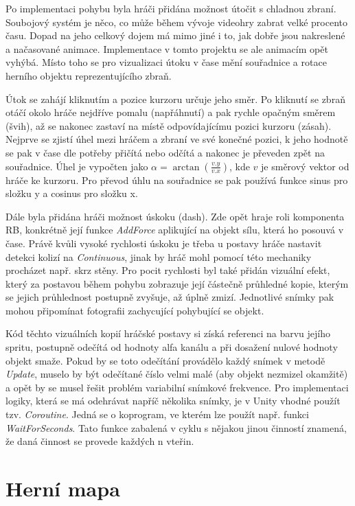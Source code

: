 \documentclass[FM,Proj,bw]{tulthesis}
\begin{document}
	Po implementaci pohybu byla hráči přidána možnost útočit s chladnou zbraní. Soubojový systém je něco, co může během vývoje videohry zabrat velké procento času. Dopad na jeho celkový dojem má mimo jiné i to, jak dobře jsou nakreslené a načasované animace. Implementace v tomto projektu se ale animacím opět vyhýbá. Místo toho se pro vizualizaci útoku v čase mění souřadnice a rotace herního objektu reprezentujícího zbraň.
	
	Útok se zahájí kliknutím a pozice kurzoru určuje jeho směr. Po kliknutí se zbraň otáčí okolo hráče nejdříve pomalu (napřáhnutí) a pak rychle opačným směrem (švih), až se nakonec zastaví na místě odpovídajícímu pozici kurzoru (zásah). Nejprve se zjistí úhel mezi hráčem a zbraní ve své konečné pozici, k jeho hodnotě se pak v čase dle potřeby přičítá nebo odčítá a nakonec je převeden zpět na souřadnice. Úhel je vypočten jako $\alpha = \arctan{(\frac{v.y}{v.x})}$, kde $v$ je směrový vektor od hráče ke kurzoru. Pro převod úhlu na souřadnice se pak používá funkce sinus pro složku y a cosinus pro složku x.
	
	Dále byla přidána hráči možnost úskoku (dash). Zde opět hraje roli komponenta RB, konkrétně její funkce \textit{AddForce} aplikující na objekt sílu, která ho posouvá v čase. Právě kvůli vysoké rychlosti úskoku je třeba u postavy hráče nastavit detekci kolizí na \textit{Continuous}, jinak by hráč mohl pomocí této mechaniky procházet např. skrz stěny. Pro pocit rychlosti byl také přidán vizuální efekt, který za postavou během pohybu zobrazuje její částečně průhledné kopie, kterým se jejich průhlednost postupně zvyšuje, až úplně zmizí. Jednotlivé snímky pak mohou připomínat fotografii zachycující pohybující se objekt.
	
	Kód těchto vizuálních kopií hráčské postavy si získá referenci na barvu jejího spritu, postupně odečítá od hodnoty alfa kanálu a při dosažení nulové hodnoty objekt smaže. Pokud by se toto odečítání provádělo každý snímek v metodě \textit{Update}, muselo by být odečítané číslo velmi malé (aby objekt nezmizel okamžitě) a opět by se musel řešit problém variabilní snímkové frekvence. Pro implementaci logiky, která se má odehrávat napříč několika snímky, je v Unity vhodné použít tzv. \textit{Coroutine}. Jedná se o koprogram, ve kterém lze použít např. funkci \textit{WaitForSeconds}. Tato funkce zabalená v cyklu s nějakou jinou činností znamená, že daná činnost se provede každých n vteřin. 
	
	\section{Herní mapa} %
	
\end{document}
